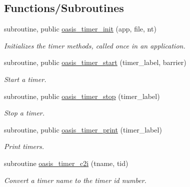 \subsection*{Functions/\+Subroutines}
\begin{DoxyCompactItemize}
\item 
subroutine, public \hyperlink{namespacemod__oasis__timer_a44a1bb64d1d892a9710d8c94d0ed0e3a}{oasis\+\_\+timer\+\_\+init} (app, file, nt)
\begin{DoxyCompactList}\small\item\em Initializes the timer methods, called once in an application. \end{DoxyCompactList}\item 
subroutine, public \hyperlink{namespacemod__oasis__timer_a13a16c07778911b45f3f42a542348019}{oasis\+\_\+timer\+\_\+start} (timer\+\_\+label, barrier)
\begin{DoxyCompactList}\small\item\em Start a timer. \end{DoxyCompactList}\item 
subroutine, public \hyperlink{namespacemod__oasis__timer_a01a76142a72cc6bc845736e79ad99bd3}{oasis\+\_\+timer\+\_\+stop} (timer\+\_\+label)
\begin{DoxyCompactList}\small\item\em Stop a timer. \end{DoxyCompactList}\item 
subroutine, public \hyperlink{namespacemod__oasis__timer_a3071ad54f61d88f16ad98ad7c0303915}{oasis\+\_\+timer\+\_\+print} (timer\+\_\+label)
\begin{DoxyCompactList}\small\item\em Print timers. \end{DoxyCompactList}\item 
subroutine \hyperlink{namespacemod__oasis__timer_a23df8ae4894ac3fde178fe17292b317b}{oasis\+\_\+timer\+\_\+c2i} (tname, tid)
\begin{DoxyCompactList}\small\item\em Convert a timer name to the timer id number. \end{DoxyCompactList}\end{DoxyCompactItemize}
